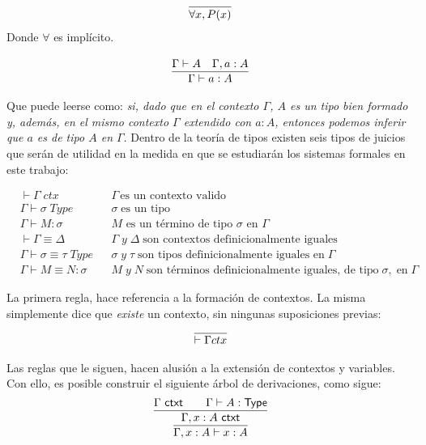 \begin{align}
\infer{\forall x, P(x)}{}
\end{align}
Donde $\forall$ es implícito.

\begin{align}
\infer{\Gamma \vdash a : A}{%
    \Gamma \vdash A
    & \deduce{\Gamma, a : A}{}
  }
\end{align}

Que puede leerse como: \textit{si, dado que en el contexto $\Gamma$, $A$ es un tipo bien formado y, además, en el mismo contexto $\Gamma$ extendido con $a : A$, entonces podemos inferir que $a$ es de tipo $A$ en $\Gamma$}.
\newline
\newline
\indent Dentro de la teoría de tipos existen seis tipos de juicios que serán de utilidad en la medida en que se estudiarán los sistemas formales en este trabajo:

\begin{align*}
&\vdash \Gamma \; ctx && \Gamma\, \text{es un contexto valido}\\
&\Gamma \vdash \sigma\; Type && \sigma\; \text{es un tipo}\\
&\Gamma \vdash M : \sigma && \text{$M$ es un término de tipo $\sigma$ en $\Gamma$}\\
&\vdash \Gamma \equiv \Delta && \Gamma \; y\; \Delta\; \text{son contextos definicionalmente iguales}\\
&\Gamma \vdash \sigma \equiv \tau\; Type && \sigma\; y\; \tau\; \text{son tipos definicionalmente iguales en}\; \Gamma\\
&\Gamma \vdash M \equiv N : \sigma && M\; y\; N\; \text{son términos definicionalmente iguales, de tipo}\; \sigma,\;\text{en}\; \Gamma
\end{align*}

La primera regla, hace referencia a la formación de contextos. La misma simplemente dice que \textit{existe} un contexto, sin ningunas suposiciones previas:
\begin{align}
\infer{\vdash \Gamma ctx}{%
    & \deduce{}{}
  }
\end{align}

Las reglas que le siguen, hacen alusión a la extensión de contextos y variables. Con ello, es posible construir el siguiente árbol de derivaciones, como sigue:
\begin{align}
\infer{\Gamma, x : A \vdash x : A}{
  \infer{\Gamma, x : A\ \mathsf{ctxt}}{
    \Gamma\ \mathsf{ctxt}
    \qquad
    \Gamma \vdash A : \mathsf{Type}
  }
}
\end{align}

